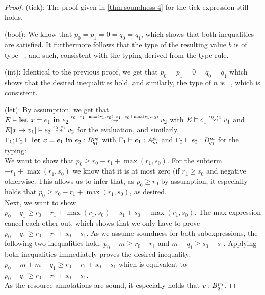 \begin{proof}

(tick): The proof given in \cref{thm:soundness-4} for the tick expression still holds.

(bool): We know that \(p_0 = p_1 = 0 = q_0 = q_1\), which shows that both inequalities are satisfied. It furthermore follows that the type of the resulting value \(b\) is of type \bool~, and such, consistent with the typing derived from the type rule.

(int): Identical to the previous proof, we get that \(p_0 = p_1 = 0 = q_0 = q_1\) which shows that the desired inequalities hold, and similarly, the type of \(n\) is \typeint~, which is consistent.

(let): By assumption, we get that \(\evals{E}{\letexp{x}{e_1}{e_2}}{v_2}{r_0 - r_1 + \max(r_1, s_0)}{s_1 - s_0 + \max(r_1, s_0)}\) with \(\evals{E}{e_1}{v_1}{r_0}{r_1}\) and \(\evals{\envaugment{E}{x}{v_1}}{e_2}{v_2}{s_0}{s_1}\) for the evaluation, and similarly, \(\Gamma_1;\Gamma_2 \vdash \mathbf{let}~x = e_1~\mathbf{in}~e_2 : B ^{p_0}_{q_1}\) with \(\Gamma_1 \vdash e_1 : A ^{p_0}_{m}\) and \(\Gamma_2 \vdash e_2 : B ^{m}_{q_1}\) for the typing: \\  
We want to show that \(p_0 \geq r_0 - r_1 + \max(r_1, s_0)\). For the subterm \(- r_1 + \max(r_1, s_0)\) we know that it is at most zero (if \(r_1 \geq s_0\) and negative otherwise. This allows us to infer that, as \(p_0 \geq r_0\) by assumption, it especially holds that \(p_0 \geq r_0 - r_1 + \max(r_1, s_0)\), as desired.  \\
Next, we want to show \(p_0 - q_1 \geq r_0 - r_1 + \max(r_1, s_0) - s_1 + s_0 - \max(r_1, s_0)\). The max expression cancel each other out, which shows that we only have to prove \(p_0 - q_1 \geq r_0 - r_1 + s_0 - s_1\). As we assume soundness for both subexpressions, the following two inequalities hold: \(p_0 - m \geq r_0 - r_1\) and \(m - q_1 \geq s_0 - s_1\). Applying both inequalities immediately proves the desired inequality: \(p_0 - m + m - q_1 \geq r_0 - r_1 + s_0 - s_1\) which is equivalent to \(p_0 - q_1 \geq r_0 - r_1 + s_0 - s_1\).\\
As the resource-annotations are sound, it especially holds that \(v : B ^{p_0}_{q_1}\).


\end{proof}































